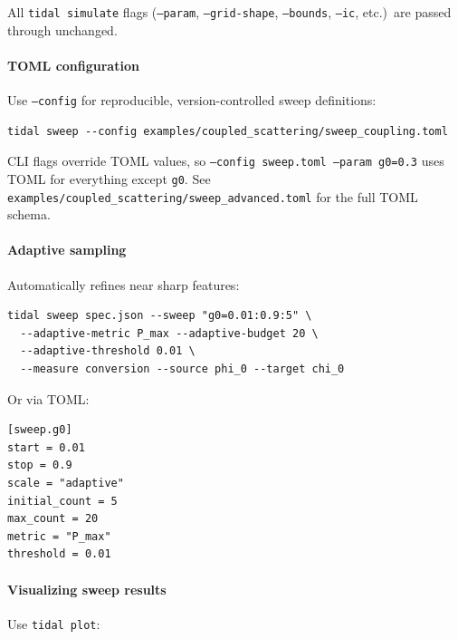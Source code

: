 All \texttt{tidal simulate} flags (\texttt{--param}, \texttt{--grid-shape}, \texttt{--bounds}, \texttt{--ic}, etc.)\ are passed through unchanged.

\paragraph{TOML configuration}

Use \texttt{--config} for reproducible, version-controlled sweep definitions:

\begin{lstlisting}[style=bash]
tidal sweep --config examples/coupled_scattering/sweep_coupling.toml
\end{lstlisting}

CLI flags override TOML values, so \texttt{--config sweep.toml --param g0=0.3} uses TOML for everything except \texttt{g0}. See \texttt{examples/coupled\_scattering/sweep\_advanced.toml} for the full TOML schema.

\paragraph{Adaptive sampling}

Automatically refines near sharp features:

\begin{lstlisting}[style=bash]
tidal sweep spec.json --sweep "g0=0.01:0.9:5" \
  --adaptive-metric P_max --adaptive-budget 20 \
  --adaptive-threshold 0.01 \
  --measure conversion --source phi_0 --target chi_0
\end{lstlisting}

Or via TOML:

\begin{lstlisting}[style=toml]
[sweep.g0]
start = 0.01
stop = 0.9
scale = "adaptive"
initial_count = 5
max_count = 20
metric = "P_max"
threshold = 0.01
\end{lstlisting}

\paragraph{Visualizing sweep results}

Use \texttt{tidal plot}:


